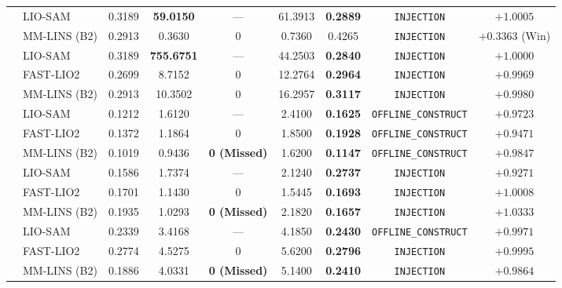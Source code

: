 \documentclass[journal]{IEEEtran}
\begin{document}
\begin{table}[!t]
{\begin{tabular}{llccccccc}
\midrule
{}
 & LIO-SAM & 0.3189 & \textbf{59.0150} & --- & 61.3913 & \textbf{0.2889} & \texttt{INJECTION} & $\bm{+1.0005}$ \\
 & MM-LINS (B2) & 0.2913 & 0.3630 & 0 & 0.7360 & 0.4265 & \texttt{INJECTION} & $+0.3363$ (Win) \\
\midrule
{}
 & LIO-SAM & 0.3189 & \textbf{755.6751} & --- & 44.2503 & \textbf{0.2840} & \texttt{INJECTION} & $\bm{+1.0000}$ \\
 & FAST-LIO2 & 0.2699 & 8.7152 & 0 & 12.2764 & \textbf{0.2964} & \texttt{INJECTION} & $\bm{+0.9969}$ \\
 & MM-LINS (B2) & 0.2913 & 10.3502 & 0 & 16.2957 & \textbf{0.3117} & \texttt{INJECTION} & $\bm{+0.9980}$ \\
\midrule
{}
 & LIO-SAM & 0.1212 & 1.6120 & --- & 2.4100 & \textbf{0.1625} & \texttt{OFFLINE\_CONSTRUCT} & $\bm{+0.9723}$ \\
 & FAST-LIO2 & 0.1372 & 1.1864 & 0 & 1.8500 & \textbf{0.1928} & \texttt{OFFLINE\_CONSTRUCT} & $\bm{+0.9471}$ \\
 & MM-LINS (B2) & 0.1019 & 0.9436 & \textbf{0 (Missed)} & 1.6200 & \textbf{0.1147} & \texttt{OFFLINE\_CONSTRUCT} & $\bm{+0.9847}$ \\
\midrule
{}
 & LIO-SAM & 0.1586 & 1.7374 & --- & 2.1240 & \textbf{0.2737} & \texttt{INJECTION} & $\bm{+0.9271}$ \\
 & FAST-LIO2 & 0.1701 & 1.1430 & 0 & 1.5445 & \textbf{0.1693} & \texttt{INJECTION} & $\bm{+1.0008}$ \\
 & MM-LINS (B2) & 0.1935 & 1.0293 & \textbf{0 (Missed)} & 2.1820 & \textbf{0.1657} & \texttt{INJECTION} & $\bm{+1.0333}$ \\
\midrule
{}
 & LIO-SAM & 0.2339 & 3.4168 & --- & 4.1850 & \textbf{0.2430} & \texttt{OFFLINE\_CONSTRUCT} & $\bm{+0.9971}$ \\
 & FAST-LIO2 & 0.2774 & 4.5275 & 0 & 5.6200 & \textbf{0.2796} & \texttt{INJECTION} & $\bm{+0.9995}$ \\
 & MM-LINS (B2) & 0.1886 & 4.0331 & \textbf{0 (Missed)} & 5.1400 & \textbf{0.2410} & \texttt{INJECTION} & $\bm{+0.9864}$ \\
\bottomrule
\end{tabular}%
}
\end{table}
\end{document}
